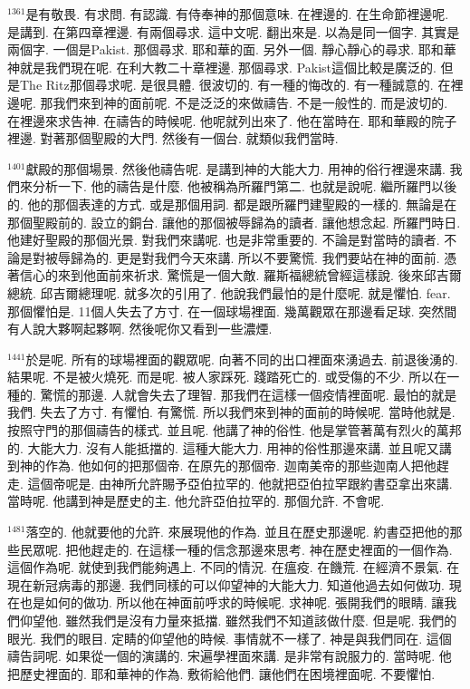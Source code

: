 \documentclass{book}
\begin{document}
$^{1361}$是有敬畏.
有求問.
有認識.
有侍奉神的那個意味.
在裡邊的.
在生命節裡邊呢.
是講到.
在第四章裡邊.
有兩個尋求.
這中文呢.
翻出來是.
以為是同一個字.
其實是兩個字.
一個是Pakist.
那個尋求.
耶和華的面.
另外一個.
靜心靜心的尋求.
耶和華神就是我們現在呢.
在利大教二十章裡邊.
那個尋求.
Pakist這個比較是廣泛的.
但是The Ritz那個尋求呢.
是很具體.
很波切的.
有一種的悔改的.
有一種誠意的.
在裡邊呢.
那我們來到神的面前呢.
不是泛泛的來做禱告.
不是一般性的.
而是波切的.
在裡邊來求告神.
在禱告的時候呢.
他呢就列出來了.
他在當時在.
耶和華殿的院子裡邊.
對著那個聖殿的大門.
然後有一個台.
就類似我們當時.

$^{1401}$獻殿的那個場景.
然後他禱告呢.
是講到神的大能大力.
用神的俗行裡邊來講.
我們來分析一下.
他的禱告是什麼.
他被稱為所羅門第二.
也就是說呢.
繼所羅門以後的.
他的那個表達的方式.
或是那個用詞.
都是跟所羅門建聖殿的一樣的.
無論是在那個聖殿前的.
設立的銅台.
讓他的那個被辱歸為的讀者.
讓他想念起.
所羅門時日.
他建好聖殿的那個光景.
對我們來講呢.
也是非常重要的.
不論是對當時的讀者.
不論是對被辱歸為的.
更是對我們今天來講.
所以不要驚慌.
我們要站在神的面前.
憑著信心的來到他面前來祈求.
驚慌是一個大敵.
羅斯福總統曾經這樣說.
後來邱吉爾總統.
邱吉爾總理呢.
就多次的引用了.
他說我們最怕的是什麼呢.
就是懼怕.
fear.
那個懼怕是.
11個人失去了方寸.
在一個球場裡面.
幾萬觀眾在那邊看足球.
突然間有人說大夥啊起夥啊.
然後呢你又看到一些濃煙.

$^{1441}$於是呢.
所有的球場裡面的觀眾呢.
向著不同的出口裡面來湧過去.
前退後湧的.
結果呢.
不是被火燒死.
而是呢.
被人家踩死.
踐踏死亡的.
或受傷的不少.
所以在一種的.
驚慌的那邊.
人就會失去了理智.
那我們在這樣一個疫情裡面呢.
最怕的就是我們.
失去了方寸.
有懼怕.
有驚慌.
所以我們來到神的面前的時候呢.
當時他就是.
按照守門的那個禱告的樣式.
並且呢.
他講了神的俗性.
他是掌管著萬有烈火的萬邦的.
大能大力.
沒有人能抵擋的.
這種大能大力.
用神的俗性那邊來講.
並且呢又講到神的作為.
他如何的把那個帝.
在原先的那個帝.
迦南美帝的那些迦南人把他趕走.
這個帝呢是.
由神所允許賜予亞伯拉罕的.
他就把亞伯拉罕跟約書亞拿出來講.
當時呢.
他講到神是歷史的主.
他允許亞伯拉罕的.
那個允許.
不會呢.

$^{1481}$落空的.
他就要他的允許.
來展現他的作為.
並且在歷史那邊呢.
約書亞把他的那些民眾呢.
把他趕走的.
在這樣一種的信念那邊來思考.
神在歷史裡面的一個作為.
這個作為呢.
就使到我們能夠遇上.
不同的情況.
在瘟疫.
在饑荒.
在經濟不景氣.
在現在新冠病毒的那邊.
我們同樣的可以仰望神的大能大力.
知道他過去如何做功.
現在也是如何的做功.
所以他在神面前呼求的時候呢.
求神呢.
張開我們的眼睛.
讓我們仰望他.
雖然我們是沒有力量來抵擋.
雖然我們不知道該做什麼.
但是呢.
我們的眼光.
我們的眼目.
定睛的仰望他的時候.
事情就不一樣了.
神是與我們同在.
這個禱告詞呢.
如果從一個的演講的.
宋遍學裡面來講.
是非常有說服力的.
當時呢.
他把歷史裡面的.
耶和華神的作為.
敷術給他們.
讓他們在困境裡面呢.
不要懼怕.
\end{document}
